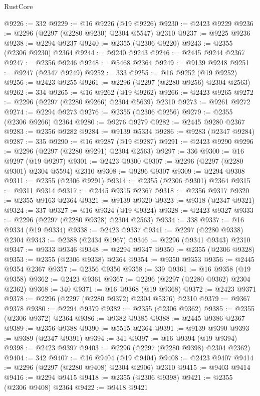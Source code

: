 \begin{lexlean}{RustCore}
\begin{coremodule}
@9226 := 332
@9229 := @16 @9226 (@19 @9226)
@9230 := @2423 @9229
@9236 := @2296 (@2297 (@2280 @9230) @2304 @5547) @2310
@9237 := @9225 @9236
@9238 := @2294 @9237
@9240 := @2355 (@2306 @9220)
@9243 := @2355 (@2306 @9230) @2364
@9244 := @9240 @9243
@9246 := @2445 @9244 @2367
@9247 := @2356 @9246
@9248 := @5468 @2364
@9249 := @9139 @9248
@9251 := @9247 (@2347 @9249)
@9252 := 333
@9255 := @16 @9252 (@19 @9252)
@9256 := @2423 @9255
@9261 := @2296 (@2297 (@2280 @9256) @2304 @2563)
@9262 := 334
@9265 := @16 @9262 (@19 @9262)
@9266 := @2423 @9265
@9272 := @2296 (@2297 (@2280 @9266) @2304 @5639) @2310
@9273 := @9261 @9272
@9274 := @2294 @9273
@9276 := @2355 (@2306 @9256)
@9279 := @2355 (@2306 @9266) @2364
@9280 := @9276 @9279
@9282 := @2445 @9280 @2367
@9283 := @2356 @9282
@9284 := @9139 @5334
@9286 := @9283 (@2347 @9284)
@9287 := 335
@9290 := @16 @9287 (@19 @9287)
@9291 := @2423 @9290
@9296 := @2296 (@2297 (@2280 @9291) @2304 @2563)
@9297 := 336
@9300 := @16 @9297 (@19 @9297)
@9301 := @2423 @9300
@9307 := @2296 (@2297 (@2280 @9301) @2304 @5594) @2310
@9308 := @9296 @9307
@9309 := @2294 @9308
@9311 := @2355 (@2306 @9291)
@9314 := @2355 (@2306 @9301) @2364
@9315 := @9311 @9314
@9317 := @2445 @9315 @2367
@9318 := @2356 @9317
@9320 := @2355 @9163 @2364
@9321 := @9139 @9320
@9323 := @9318 (@2347 @9321)
@9324 := 337
@9327 := @16 @9324 (@19 @9324)
@9328 := @2423 @9327
@9333 := @2296 (@2297 (@2280 @9328) @2304 @2563)
@9334 := 338
@9337 := @16 @9334 (@19 @9334)
@9338 := @2423 @9337
@9341 := @2297 (@2280 @9338) @2304
@9343 := @2388 (@2434 @1967)
@9346 := @2296 (@9341 @9343) @2310
@9347 := @9333 @9346
@9348 := @2294 @9347
@9350 := @2355 (@2306 @9328)
@9353 := @2355 (@2306 @9338) @2364
@9354 := @9350 @9353
@9356 := @2445 @9354 @2367
@9357 := @2356 @9356
@9358 := 339
@9361 := @16 @9358 (@19 @9358)
@9362 := @2423 @9361
@9367 := @2296 (@2297 (@2280 @9362) @2304 @2362)
@9368 := 340
@9371 := @16 @9368 (@19 @9368)
@9372 := @2423 @9371
@9378 := @2296 (@2297 (@2280 @9372) @2304 @5376) @2310
@9379 := @9367 @9378
@9380 := @2294 @9379
@9382 := @2355 (@2306 @9362)
@9385 := @2355 (@2306 @9372) @2364
@9386 := @9382 @9385
@9388 := @2445 @9386 @2367
@9389 := @2356 @9388
@9390 := @5515 @2364
@9391 := @9139 @9390
@9393 := @9389 (@2347 @9391)
@9394 := 341
@9397 := @16 @9394 (@19 @9394)
@9398 := @2423 @9397
@9403 := @2296 (@2297 (@2280 @9398) @2304 @2362)
@9404 := 342
@9407 := @16 @9404 (@19 @9404)
@9408 := @2423 @9407
@9414 := @2296 (@2297 (@2280 @9408) @2304 @2906) @2310
@9415 := @9403 @9414
@9416 := @2294 @9415
@9418 := @2355 (@2306 @9398)
@9421 := @2355 (@2306 @9408) @2364
@9422 := @9418 @9421

\end{coremodule}
\end{lexlean}
